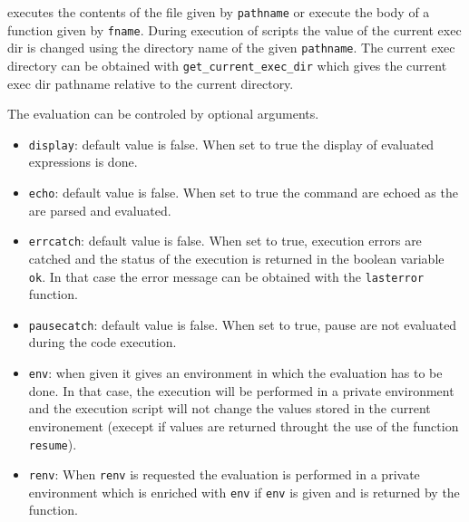 \begin{mandescription}
  executes the contents of the file given by \verb!pathname! or execute 
  the body of a function given by \verb!fname!. 
  During execution of scripts the value of the current exec dir is 
  changed using the directory name of the given \verb!pathname!. 
  The current exec directory can be obtained with \verb!get_current_exec_dir! 
  which gives the current exec dir pathname relative to the current directory. 

  The evaluation can be controled by optional arguments. 
  
  \begin{itemize}
    \item \verb!display!: default value is false. When set to true the 
      display of evaluated expressions is done. 
    \item \verb!echo!: default value is false. When set to true the 
      command are echoed as the are parsed and evaluated. 
    \item \verb!errcatch!: default value is false. When set to true, 
      execution errors are catched and the status of the execution is 
      returned in the boolean variable \verb!ok!. In that case the 
      error message can be obtained with the \verb!lasterror! function.
    \item \verb!pausecatch!: default value is false. When set to true, 
      pause are not evaluated during the code execution. 
    \item \verb!env!: when given it gives an environment in which the 
      evaluation has to be done. In that case, the execution will 
      be performed in a private environment and the execution script 
      will not change the values stored in the current environement 
      (execept if values are returned throught the use of the function
      \verb!resume!).
    \item \verb!renv!: When \verb!renv! is requested the evaluation 
      is performed in a private environment which is enriched with 
      \verb!env! if \verb!env! is given and is returned by the function.
  \end{itemize}
\end{mandescription}
\begin{examples}
  \begin{Verbatim}

  \end{Verbatim}
\end{examples}
\begin{manseealso}
\end{manseealso}
